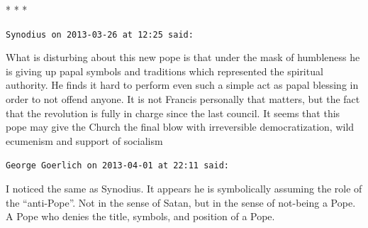 
\begin{center}* * *\end{center}

\begin{footnotesize}
\begin{sffamily}
\texttt{Synodius on 2013-03-26 at 12:25 said:}

What is disturbing about this new pope is that under the mask of humbleness he is giving up papal symbols and traditions which represented the spiritual authority. He finds it hard to perform even such a simple act as papal blessing in order to not offend anyone. It is not Francis personally that matters, but the fact that the revolution is fully in charge since the last council. It seems that this pope may give the Church the final blow with irreversible democratization, wild ecumenism and support of socialism

\hfill

\texttt{George Goerlich on 2013-04-01 at 22:11 said:}

I noticed the same as Synodius. It appears he is symbolically assuming the role of the ``anti-Pope''. Not in the sense of Satan, but in the sense of not-being a Pope. A Pope who denies the title, symbols, and position of a Pope.

\end{sffamily}
\end{footnotesize}

